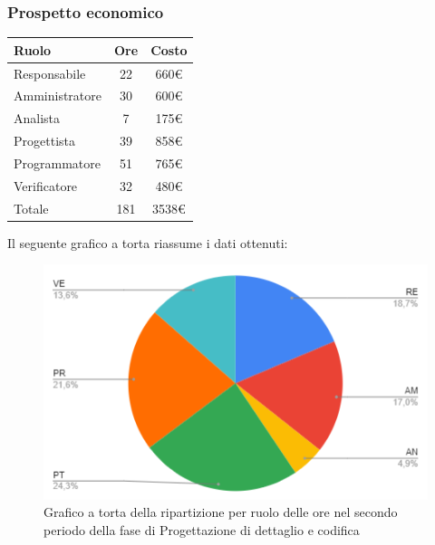 {{{{{{{{{{{		\subsubsection{Prospetto economico}\label{PreventivoFaseDiProgettazioneDiDettaglioECodificaProspettoEconomicoPeriodo2}
		\quad
		\def\tabularxcolumn#1{m{#1}}
		{
			\begin{center}
				\renewcommand{\arraystretch}{1.4}
				\begin{tabularx}{7cm}{|X|c|c|}
					\hline
					\rowcolor{airforceblue}
					\textbf{Ruolo} & \textbf{Ore} & \textbf{Costo}\\
					\hline
					Responsabile & 22 & 660\euro\\
					\hline
					Amministratore & 30 & 600\euro\\
					\hline
					Analista & 7 & 175\euro\\
					\hline
					Progettista & 39 & 858\euro\\
					\hline
					Programmatore & 51 & 765\euro\\
					\hline
					Verificatore & 32 & 480\euro\\
					\hline
					Totale & 181 & 3538\euro\\
					\hline
				\end{tabularx}
			\end{center}
			
			Il seguente grafico a torta riassume i dati ottenuti:
			\begin{figure}[!ht]
				\begin{center}
					\includegraphics[width=0.8\linewidth]{../immagini/pdp/torta_progettazione_dettaglio_periodo2.png}
					\caption{Grafico a torta della ripartizione per ruolo delle ore nel secondo periodo della fase di Progettazione
						di dettaglio e codifica}
				\end{center}
			\end{figure}

}}}}}}}}}}}}
